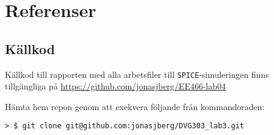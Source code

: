 %
%

\section{Referenser}\label{refs}



\subsection{Källkod}\label{sourcefiles}
Källkod till rapporten med alla arbetsfiler till \texttt{SPICE}-simuleringen
finns tillgängliga på \url{https://github.com/jonasjberg/EE466-lab04}
\par Hämta hem repon genom att exekvera följande från kommandoraden:
\begin{verbatim}
> $ git clone git@github.com:jonasjberg/DVG303_lab3.git
\end{verbatim}

